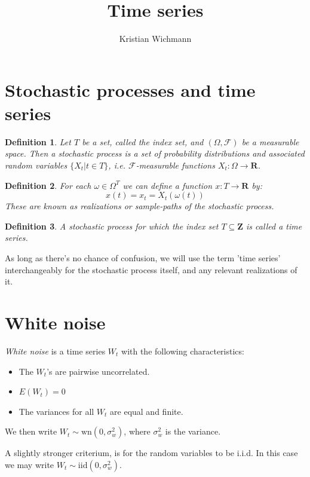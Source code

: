 \documentclass[12pt, a4paper]{article}
\title{Time series}
\author{Kristian Wichmann}
\newtheorem{definition}{Definition}[section]
\numberwithin{equation}{section}
\begin{document}
\maketitle

\section{Stochastic processes and time series}
\begin{definition}
Let $T$ be a set, called the index set, and $(\Omega, \mathcal{F})$ be a measurable space. Then a stochastic process is a set of probability distributions and associated random variables $\{X_t|t\in T\}$, i.e. $\mathcal{F}$-measurable functions $X_t: \Omega\rightarrow\mathbf{R}$.
\end{definition}

\begin{definition}
For each $\omega\in\Omega^T$ we can define a function $x:T\rightarrow\mathbf{R}$ by:
\begin{equation}
x(t)=x_t=X_t(\omega(t))
\end{equation}
These are known as realizations or sample-paths of the stochastic process.
\end{definition}

\begin{definition}
A stochastic process for which the index set $T\subseteq\mathbf{Z}$ is called a time series.
\end{definition}
As long as there's no chance of confusion, we will use the term 'time series' interchangeably for the stochastic process itself, and any relevant realizations of it.

\section{White noise}
\textit{White noise} is a time series $W_t$ with the following characteristics:
\begin{itemize}
\item The $W_t$'s are pairwise uncorrelated.
\item $E(W_t)=0$
\item The variances for all $W_t$ are equal and finite.
\end{itemize}
We then write $W_t\sim\textrm{wn}(0,\sigma_w^2)$, where $\sigma_w^2$ is the variance.

A slightly stronger criterium, is for the random variables to be i.i.d. In this case we may write $W_t\sim\textrm{iid}(0,\sigma_w^2)$.
\end{document}
